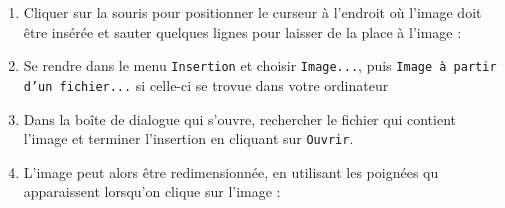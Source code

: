 \begin{enumerate}
\item Cliquer sur la souris pour positionner le curseur à l'endroit où l'image doit être insérée et sauter quelques lignes pour laisser de la place à l'image :


\item Se rendre dans le menu \texttt{Insertion} et choisir \texttt{Image...}, puis \texttt{Image à partir d'un fichier...} si celle-ci se trovue dans votre ordinateur


\item Dans la boîte de dialogue qui s'ouvre, rechercher le fichier qui contient l'image et terminer l'insertion en cliquant sur \texttt{Ouvrir}.

\item L'image peut alors être redimensionnée, en utilisant les poignées qu apparaissent lorsqu'on clique sur l'image :
\end{enumerate}


